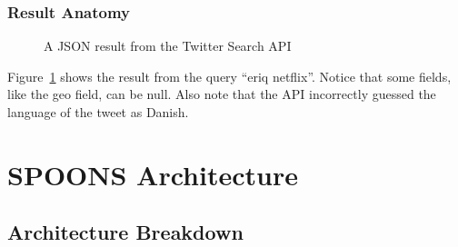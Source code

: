 \documentclass[12pt]{ucthesis}
\newcommand{\captionfonts}{\small\bf\ssp}
\begin{document}
\section{Result Anatomy}
\begin{figure}
   \begin{center}
      \captionfonts
      \caption[Twitter Search API Result]{A JSON result from the Twitter Search API}
      \label{fig:apiRes}
   \end{center}
\end{figure}

Figure~\ref{fig:apiRes} shows the result from the query ``eriq netflix''. Notice that some fields,
like the \textsf{geo} field, can be null. Also note that the API incorrectly guessed the language of the tweet as Danish.

\part{SPOONS Architecture}
\label{arch}

\chapter{Architecture Breakdown}
\label{arch-breakdown}
\end{document}
